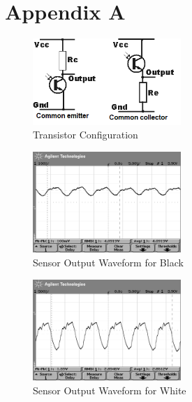 \documentclass{article}
\begin{document}

\clearpage

\section{Appendix A}

\begin{figure}[!h]
\centerline{\includegraphics[width=0.5\textwidth]{transistor-config}}
\caption{Transistor Configuration}
\label{fig:transconfig}
\end{figure}

\begin{figure}[!h]
\centerline{\includegraphics[width=0.5\textwidth]{Waveform-BlackLine}}
\caption{Sensor Output Waveform for Black}
\label{fig:waveblack}
\end{figure}

\begin{figure}[!h]
\centerline{\includegraphics[width=0.5\textwidth]{Waveform-White}}
\caption{Sensor Output Waveform for White}
\label{fig:wavewhite}
\end{figure}
\end{document}
